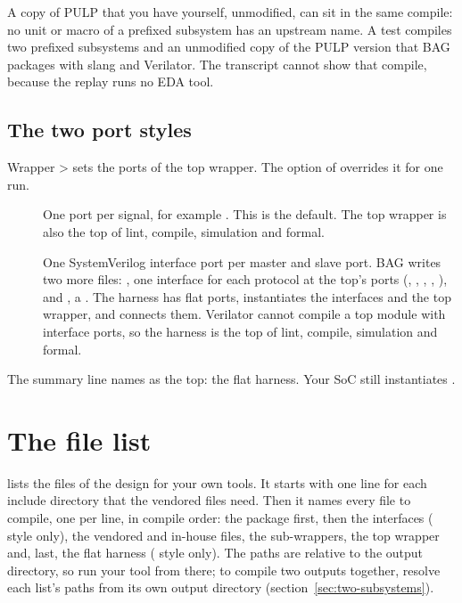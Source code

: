 A copy of PULP that you have yourself, unmodified, can sit in the same compile: no unit or
macro of a prefixed subsystem has an upstream name. A test compiles two prefixed subsystems
and an unmodified copy of the PULP version that BAG packages with slang and Verilator. The
transcript cannot show that compile, because the replay runs no EDA tool.

\subsection{The two port styles}

Wrapper >  sets the ports of the top wrapper. The option
 of  overrides it for one run.

\begin{description}
\item[] One port per signal, for example . This is the
  default. The top wrapper is also the top of lint, compile, simulation and formal.
\item[] One SystemVerilog interface port per master and slave port.
  BAG writes two more files: , one interface for each
  protocol at the top's ports (, , , ,
  ), and , a . The harness has
  flat ports, instantiates the interfaces and the top wrapper, and connects them.
  Verilator cannot compile a top module with interface ports, so the harness is the top
  of lint, compile, simulation and formal.
\end{description}



The summary line names  as the top: the flat harness. Your SoC
still instantiates .

\section{The file list}
\label{sec:filelist}

 lists the files of the design for your own tools. It starts with one
 line for each include directory that the vendored files need. Then it
names every file to compile, one per line, in compile order: the package first, then the
interfaces ( style only), the vendored and in-house files, the
sub-wrappers, the top wrapper and, last, the flat harness ( style
only). The paths are relative to the output directory, so run your tool from there; to
compile two outputs together, resolve each list's paths from its own output directory
(section~\ref{sec:two-subsystems}).

